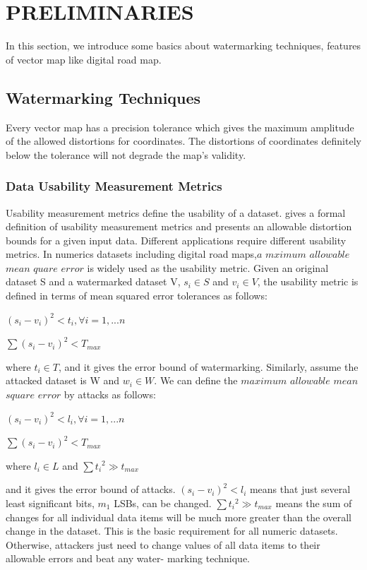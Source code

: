\section{PRELIMINARIES}
\label{sec:pre}
In this section, we introduce some basics about watermarking techniques, features of vector map like digital road map.


\subsection{Watermarking Techniques}

Every vector map has a precision tolerance which gives the maximum amplitude of the allowed
distortions for coordinates. The distortions of coordinates definitely below the tolerance
will not degrade the map's validity. 

\subsubsection{Data Usability Measurement Metrics}

Usability measurement metrics define the usability of a dataset. \cite{DBLP:conf/itcc/Sion02} 
gives a formal definition of usability measurement metrics and presents an allowable 
distortion bounds for a given input data. Different applications require different usability metrics. 
In numerics datasets including digital road maps,$a$ $mximum$ $allowable$ $mean$ $quare$ $error$ 
is widely used as the usability metric. Given an original dataset S and a watermarked dataset V,
${s}_{i}\in S$ and ${v}_{i}\in V$, the usability metric is defined in terms of mean squared error 
tolerances as follows:

${({s}_{i}-{v}_{i})}^{2}<{t}_{i},\forall i=1,...n$

$\sum {{({s}_{i}-{v}_{i})}^{2}<{T}_{max}}$

where ${t}_{i}\in T$, and it gives the error bound of watermarking. 
Similarly, assume the attacked dataset is W and ${w}_{i}\in W$. We can define the
$maximum$ $allowable$ $mean$ $square$ $error$ by attacks as follows:

${({s}_{i}-{v}_{i})}^{2}<{l}_{i},\forall i=1,...n$

$\sum{{({s}_{i}-{v}_{i})}^{2}<{T}_{max}}$

where ${l}_{i}\in L$ and $\sum {{{t}_{i}}^{2}}\gg {t}_{max}$

and it gives the error bound of attacks. 
${({s}_{i}-{v}_{i})}^{2}<{l}_{i}$ means that just several
least significant bits, ${m}_{1}$ LSBs, can be changed.
$\sum{{{t}_{i}}^{2}}\gg {t}_{max}$
 means the sum of changes for all individual data
items will be much more greater than the overall change in
the dataset. This is the basic requirement for all numeric
datasets. Otherwise, attackers just need to change values of
all data items to their allowable errors and beat any water-
marking technique.



